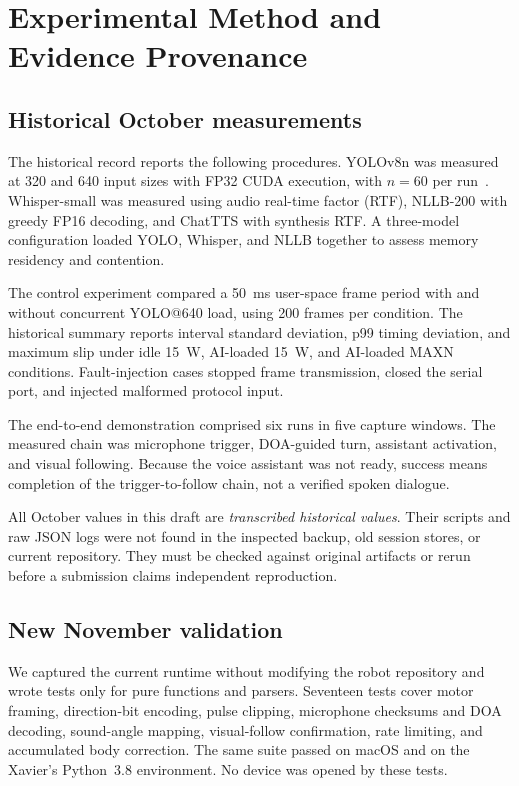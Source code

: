 \documentclass[conference]{IEEEtran}
\begin{document}
\section{Experimental Method and Evidence Provenance}
\subsection{Historical October measurements}
The historical record reports the following procedures. YOLOv8n was measured at 320 and 640 input sizes with FP32 CUDA execution, with $n=60$ per run~\cite{jocher2023yolov8}. Whisper-small was measured using audio real-time factor (RTF), NLLB-200 with greedy FP16 decoding, and ChatTTS with synthesis RTF. A three-model configuration loaded YOLO, Whisper, and NLLB together to assess memory residency and contention.

The control experiment compared a 50~ms user-space frame period with and without concurrent YOLO@640 load, using 200 frames per condition. The historical summary reports interval standard deviation, p99 timing deviation, and maximum slip under idle 15~W, AI-loaded 15~W, and AI-loaded MAXN conditions. Fault-injection cases stopped frame transmission, closed the serial port, and injected malformed protocol input.

The end-to-end demonstration comprised six runs in five capture windows. The measured chain was microphone trigger, DOA-guided turn, assistant activation, and visual following. Because the voice assistant was not ready, success means completion of the trigger-to-follow chain, not a verified spoken dialogue.

All October values in this draft are \emph{transcribed historical values}. Their scripts and raw JSON logs were not found in the inspected backup, old session stores, or current repository. They must be checked against original artifacts or rerun before a submission claims independent reproduction.

\subsection{New November validation}
We captured the current runtime without modifying the robot repository and wrote tests only for pure functions and parsers. Seventeen tests cover motor framing, direction-bit encoding, pulse clipping, microphone checksums and DOA decoding, sound-angle mapping, visual-follow confirmation, rate limiting, and accumulated body correction. The same suite passed on macOS and on the Xavier's Python~3.8 environment. No device was opened by these tests.
\end{document}
